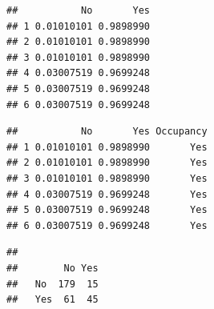 \documentclass[]{article}
\newenvironment{Shaded}{\begin{snugshade}}{\end{snugshade}}
\newcommand{\CommentTok}[1]{\textcolor[rgb]{0.56,0.35,0.01}{\textit{#1}}}
\newcommand{\ControlFlowTok}[1]{\textcolor[rgb]{0.13,0.29,0.53}{\textbf{#1}}}
\newcommand{\FloatTok}[1]{\textcolor[rgb]{0.00,0.00,0.81}{#1}}
\newcommand{\KeywordTok}[1]{\textcolor[rgb]{0.13,0.29,0.53}{\textbf{#1}}}
\newcommand{\NormalTok}[1]{#1}
\newcommand{\OperatorTok}[1]{\textcolor[rgb]{0.81,0.36,0.00}{\textbf{#1}}}
\newcommand{\StringTok}[1]{\textcolor[rgb]{0.31,0.60,0.02}{#1}}
\begin{document}
\begin{verbatim}
##           No       Yes
## 1 0.01010101 0.9898990
## 2 0.01010101 0.9898990
## 3 0.01010101 0.9898990
## 4 0.03007519 0.9699248
## 5 0.03007519 0.9699248
## 6 0.03007519 0.9699248
\end{verbatim}

\begin{Shaded}
\end{Shaded}

\begin{verbatim}
##           No       Yes Occupancy
## 1 0.01010101 0.9898990       Yes
## 2 0.01010101 0.9898990       Yes
## 3 0.01010101 0.9898990       Yes
## 4 0.03007519 0.9699248       Yes
## 5 0.03007519 0.9699248       Yes
## 6 0.03007519 0.9699248       Yes
\end{verbatim}

\begin{Shaded}
\end{Shaded}

\begin{verbatim}
##      
##        No Yes
##   No  179  15
##   Yes  61  45
\end{verbatim}
\end{document}
